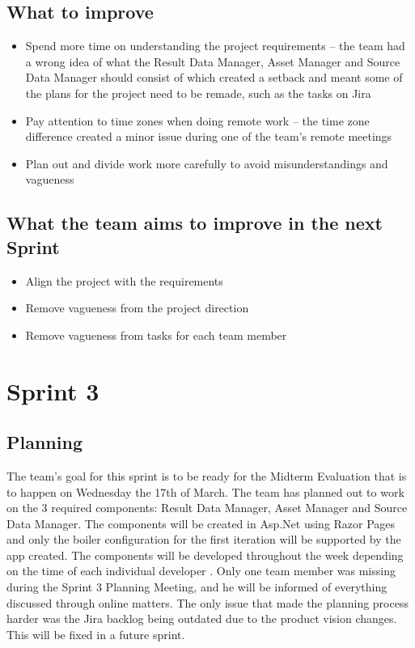 \documentclass[12pt]{report}
\begin{document}
\subsection*{What to improve}
\begin{itemize}
    \item Spend more time on understanding the project requirements -- the team had a wrong idea of what the Result Data Manager, Asset Manager and Source Data Manager should consist of which created a setback and meant some of the plans for the project need to be remade, such as the tasks on Jira
    \item Pay attention to time zones when doing remote work -- the time zone difference created a minor issue during one of the team's remote meetings
    \item Plan out and divide work more carefully to avoid misunderstandings and vagueness
\end{itemize}

\subsection*{What the team aims to improve in the next Sprint}
\begin{itemize}
    \item Align the project with the requirements
    \item Remove vagueness from the project direction
    \item Remove vagueness from tasks for each team member
\end{itemize}
\clearpage




\section{Sprint 3}
\subsection*{Planning}
The team's goal for this sprint is to be ready for the Midterm Evaluation that is to happen on
Wednesday the 17th of March. The team has planned out to work on the 3 required components:
Result Data Manager, Asset Manager and Source Data Manager. The components will be created in
Asp.Net using Razor Pages and only the boiler configuration for the first iteration will be supported
by the app created. The components will be developed throughout the week depending on the time
of each individual developer . Only one team member was missing during the Sprint 3 Planning
Meeting, and he will be informed of everything discussed through online matters. The only issue that
made the planning process harder was the Jira backlog being outdated due to the product vision
changes. This will be fixed in a future sprint.
\end{document}

